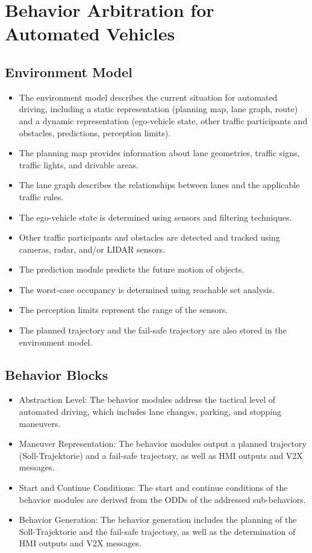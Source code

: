 \section{Behavior Arbitration for Automated Vehicles}
\subsection{Environment Model}

\begin{itemize}
    \item The environment model describes the current situation for automated driving, including a static representation (planning map, lane graph, route) and a dynamic representation (ego-vehicle state, other traffic participants and obstacles, predictions, perception limits).
    \item The planning map provides information about lane geometries, traffic signs, traffic lights, and drivable areas.
    \item The lane graph describes the relationships between lanes and the applicable traffic rules.
    \item The ego-vehicle state is determined using sensors and filtering techniques.
    \item Other traffic participants and obstacles are detected and tracked using cameras, radar, and/or LIDAR sensors.
    \item The prediction module predicts the future motion of objects.
    \item The worst-case occupancy is determined using reachable set analysis.
    \item The perception limits represent the range of the sensors.
    \item The planned trajectory and the fail-safe trajectory are also stored in the environment model.
\end{itemize}

\subsection{Behavior Blocks}

\begin{itemize}
    \item Abstraction Level: The behavior modules address the tactical level of automated driving, which includes lane changes, parking, and stopping maneuvers.
    \item Maneuver Representation: The behavior modules output a planned trajectory (Soll-Trajektorie) and a fail-safe trajectory, as well as HMI outputs and V2X messages.
    \item Start and Continue Conditions: The start and continue conditions of the behavior modules are derived from the ODDs of the addressed sub-behaviors.
    \item Behavior Generation: The behavior generation includes the planning of the Soll-Trajektorie and the fail-safe trajectory, as well as the determination of HMI outputs and V2X messages.
\end{itemize}

